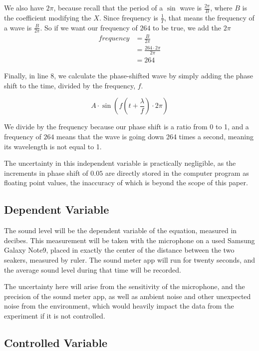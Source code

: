 \documentclass[index]{subfiles}
\begin{document}
We also have \(2\pi\), because recall that the period of a \(\sin\) wave is \(\frac{2\pi}{B}\), where \(B\) is the coefficient modifying the \(X\). Since frequency is \(\frac{1}{T}\), that means the frequency of a wave is \(\frac{B}{2\pi}\). So if we want our frequency of \(264\) to be true, we add the \(2\pi\)
\begin{align*}
    frequency & =\frac{B}{2\pi}            \\
              & =\frac{264\cdot2\pi}{2\pi} \\
              & =264
\end{align*}

Finally, in line 8, we calculate the phase-shifted wave by simply adding the phase shift to the time, divided by the frequency, \(f\).

\begin{equation*}
    A\cdot\sin\left(f\left(t+\frac{\lambda}{f}\right)\cdot2\pi\right)
\end{equation*}

We divide by the frequency because our phase shift is a ratio from 0 to 1, and a frequency of \(264\) means that the wave is going down 264 times a second, meaning its wavelength is not equal to 1.

The uncertainty in this independent variable is practically negligible, as the increments in phase shift of \(0.05\) are directly stored in the computer program as floating point values, the inaccuracy of which is beyond the scope of this paper.

\subsection{Dependent Variable}

The sound level will be the dependent variable of the equation, measured in decibes. This measurement will be taken with the microphone on a used Samsung Galaxy Note9, placed in exactly the center of the distance between the two seakers, measured by ruler. The sound meter app will run for twenty seconds, and the average sound level during that time will be recorded.

The uncertainty here will arise from the sensitivity of the microphone, and the precision of the sound meter app, as well as ambient noise and other unexpected noise from the environment, which would heavily impact the data from the experiment if it is not controlled.

\subsection{Controlled Variable}
\end{document}

